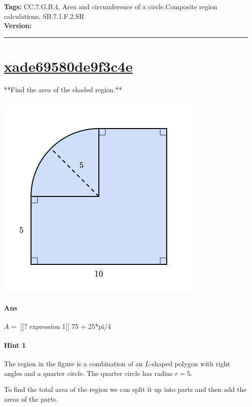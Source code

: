 \documentclass[twocolumn,10pt]{article}
\def\shrinkfactor{0.45}
\begin{document}
\medskip
\noindent
\textbf{Tags:} {\footnotesize CC.7.G.B.4, Area and circumference of a circle.Composite region calculations, SB.7.1.F.2.SR}\\
\textbf{Version:} \DIFdelbegin {}\DIFdelend \DIFaddbegin {}\DIFaddend \smallskip\hrule





\section{\href{https://www.khanacademy.org/devadmin/content/items/xade69580de9f3c4e}{xade69580de9f3c4e}}

\noindent
**Find the area of the shaded region.**


\includegraphics[scale=\shrinkfactor]{figures/b0216381822fdf828c9b1c0c60a3da3a18cdb9da.png}


\paragraph{Ans} $A =$ 
[[? expression 1]]  75 + 25*pi/4

\paragraph{Hint 1}The region in the figure is a combination of an $L$-shaped polygon with right angles and a quarter circle.  The quarter circle has radius $r=5$.

To find the total area of the region we can split it up into parts and then add the areas of the parts.
\end{document}
